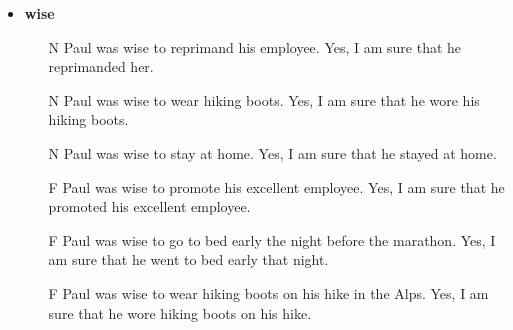 \documentclass[11pt,fleqn]{article}
\newcommand{\6}{\mbox{$[\hspace*{-.6mm}[$}}
\newcommand{\9}{\mbox{$]\hspace*{-.6mm}]$}}
\begin{document}
\begin{itemize}[itemsep=-1pt]
\begin{enumerate}[topsep=0pt,itemsep=-4pt]
\end{enumerate}

\item {\bf wise}

\begin{enumerate}[topsep=0pt,itemsep=-4pt]

\item[N]  	Paul was wise to reprimand his employee.	Yes, I am sure that he reprimanded her.
\item[N]  	Paul was wise to wear hiking boots.	Yes, I am sure that he wore his hiking boots.
\item[N]  	Paul was wise to stay at home.	Yes, I am sure that he stayed at home.
\item[F]  	Paul was wise to promote his excellent employee.	Yes, I am sure that he promoted his excellent employee.
\item[F]  	Paul was wise to go to bed early the night before the marathon.	Yes, I am sure that he went to bed early that night.
\item[F]  	Paul was wise to wear hiking boots on his hike in the Alps.	Yes, I am sure that he wore hiking boots on his hike.

\end{enumerate}

\end{itemize}



\end{document}
